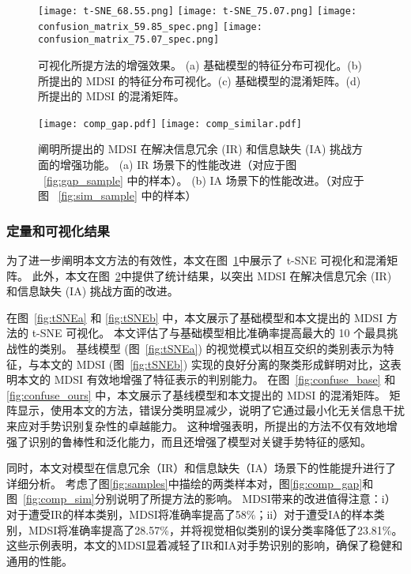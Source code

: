 \begin{figure}
  \centering
  \subcaptionbox{\label{fig:tSNEa}}
    {\texttt{[image: t-SNE\_68.55.png]}}
  \subcaptionbox{\label{fig:tSNEb}}
    {\texttt{[image: t-SNE\_75.07.png]}}
  \subcaptionbox{\label{fig:confuse_base}}
    {\texttt{[image: confusion\_matrix\_59.85\_spec.png]}}
  \subcaptionbox{\label{fig:confuse_ours}}
    {\texttt{[image: confusion\_matrix\_75.07\_spec.png]}}
  \caption{可视化所提方法的增强效果。 (a) 基础模型的特征分布可视化。(b) 所提出的 MDSI 的特征分布可视化。(c) 基础模型的混淆矩阵。(d) 所提出的 MDSI 的混淆矩阵。}
  \label{fig:vis}
\end{figure}

\begin{figure}
  \centering
  \subcaptionbox{\label{fig:comp_gap}}
    {\texttt{[image: comp\_gap.pdf]}}
  \subcaptionbox{\label{fig:comp_sim}}
    {\texttt{[image: comp\_similar.pdf]}}
  \caption{阐明所提出的 MDSI 在解决信息冗余 (IR) 和信息缺失 (IA) 挑战方面的增强功能。 (a) IR 场景下的性能改进（对应于图 ~\ref{fig:gap_sample} 中的样本）。 (b) IA 场景下的性能改进。（对应于图 ~\ref{fig:sim_sample} 中的样本）}
  \label{fig:comp}
\end{figure}

\subsubsection{定量和可视化结果}
为了进一步阐明本文方法的有效性，本文在图~\ref{fig:vis}中展示了 t-SNE 可视化和混淆矩阵。
此外，本文在图~\ref{fig:comp}中提供了统计结果，以突出 MDSI 在解决信息冗余 (IR) 和信息缺失 (IA) 挑战方面的改进。

在图~\ref{fig:tSNEa} 和 \ref{fig:tSNEb} 中，本文展示了基础模型和本文提出的 MDSI 方法的 t-SNE 可视化。
本文评估了与基础模型相比准确率提高最大的 10 个最具挑战性的类别。
基线模型 (图~\ref{fig:tSNEa}) 的视觉模式以相互交织的类别表示为特征，与本文的 MDSI (图~\ref{fig:tSNEb}) 实现的良好分离的聚类形成鲜明对比，这表明本文的 MDSI 有效地增强了特征表示的判别能力。
在图~\ref{fig:confuse_base} 和 \ref{fig:confuse_ours} 中，本文展示了基线模型和本文提出的 MDSI 的混淆矩阵。
矩阵显示，使用本文的方法，错误分类明显减少，说明了它通过最小化无关信息干扰来应对手势识别复杂性的卓越能力。
这种增强表明，所提出的方法不仅有效地增强了识别的鲁棒性和泛化能力，而且还增强了模型对关键手势特征的感知。

同时，本文对模型在信息冗余（IR）和信息缺失（IA）场景下的性能提升进行了详细分析。
考虑了图\ref{fig:samples}中描绘的两类样本对，图\ref{fig:comp_gap}和图~\ref{fig:comp_sim}分别说明了所提方法的影响。
MDSI带来的改进值得注意：i）对于遭受IR的样本类别，MDSI将准确率提高了58\%；ii）对于遭受IA的样本类别，MDSI将准确率提高了28.57\%，并将视觉相似类别的误分类率降低了23.81\%。
这些示例表明，本文的MDSI显着减轻了IR和IA对手势识别的影响，确保了稳健和通用的性能。



